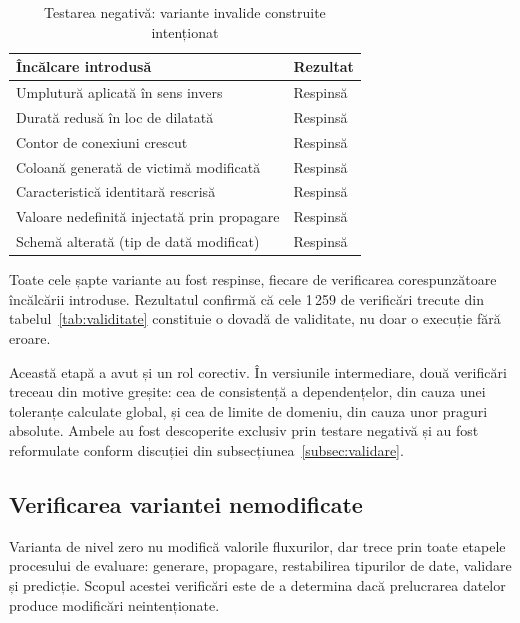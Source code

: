\begin{table}[!ht]
    \caption{Testarea negativă: variante invalide construite intenționat}
    \centering
    \begin{tabular}{|p{6.4cm}|l|}
        \hline
        \textbf{Încălcare introdusă} & \textbf{Rezultat} \\
        \hline
        Umplutură aplicată în sens invers & Respinsă \\
        \hline
        Durată redusă în loc de dilatată & Respinsă \\
        \hline
        Contor de conexiuni crescut & Respinsă \\
        \hline
        Coloană generată de victimă modificată & Respinsă \\
        \hline
        Caracteristică identitară rescrisă & Respinsă \\
        \hline
        Valoare nedefinită injectată prin propagare & Respinsă \\
        \hline
        Schemă alterată (tip de dată modificat) & Respinsă \\
        \hline
    \end{tabular}
    \label{tab:negativ}
\end{table}

Toate cele șapte variante au fost respinse, fiecare de verificarea corespunzătoare încălcării introduse. Rezultatul confirmă că cele 1\,259 de verificări trecute din tabelul~\ref{tab:validitate} constituie o dovadă de validitate, nu doar o execuție fără eroare.

Această etapă a avut și un rol corectiv. În versiunile intermediare, două verificări treceau din motive greșite: cea de consistență a dependențelor, din cauza unei toleranțe calculate global, și cea de limite de domeniu, din cauza unor praguri absolute. Ambele au fost descoperite exclusiv prin testare negativă și au fost reformulate conform discuției din subsecțiunea~\ref{subsec:validare}.

\subsection{Verificarea variantei nemodificate}
\label{subsec:invidentitate}

Varianta de nivel zero nu modifică valorile fluxurilor, dar trece prin toate etapele procesului de evaluare: generare, propagare, restabilirea tipurilor de date, validare și predicție. Scopul acestei verificări este de a determina dacă prelucrarea datelor produce modificări neintenționate.

